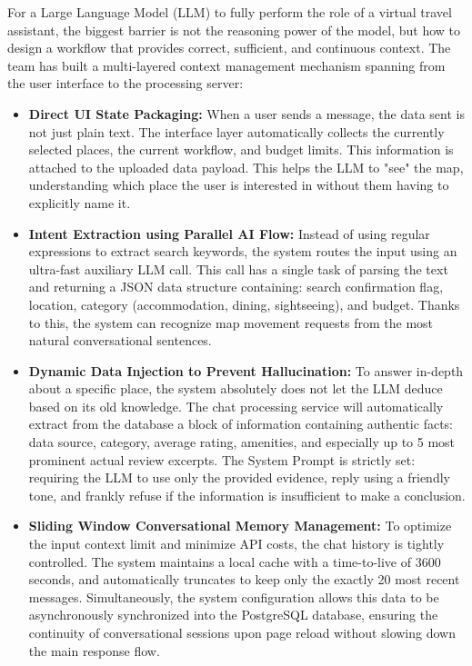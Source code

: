 \documentclass[12pt, a4paper]{article}
\begin{document}
\label{sec:llm_context}
For a Large Language Model (LLM) to fully perform the role of a virtual travel assistant, the biggest barrier is not the reasoning power of the model, but how to design a workflow that provides correct, sufficient, and continuous context. The team has built a multi-layered context management mechanism spanning from the user interface to the processing server:

\begin{itemize}
    \item \textbf{Direct UI State Packaging:} When a user sends a message, the data sent is not just plain text. The interface layer automatically collects the currently selected places, the current workflow, and budget limits. This information is attached to the uploaded data payload. This helps the LLM to "see" the map, understanding which place the user is interested in without them having to explicitly name it.
    \item \textbf{Intent Extraction using Parallel AI Flow:} Instead of using regular expressions to extract search keywords, the system routes the input using an ultra-fast auxiliary LLM call. This call has a single task of parsing the text and returning a JSON data structure containing: search confirmation flag, location, category (accommodation, dining, sightseeing), and budget. Thanks to this, the system can recognize map movement requests from the most natural conversational sentences.
    \item \textbf{Dynamic Data Injection to Prevent Hallucination:} To answer in-depth about a specific place, the system absolutely does not let the LLM deduce based on its old knowledge. The chat processing service will automatically extract from the database a block of information containing authentic facts: data source, category, average rating, amenities, and especially up to 5 most prominent actual review excerpts. The System Prompt is strictly set: requiring the LLM to use only the provided evidence, reply using a friendly tone, and frankly refuse if the information is insufficient to make a conclusion.
    \item \textbf{Sliding Window Conversational Memory Management:} To optimize the input context limit and minimize API costs, the chat history is tightly controlled. The system maintains a local cache with a time-to-live of 3600 seconds, and automatically truncates to keep only the exactly 20 most recent messages. Simultaneously, the system configuration allows this data to be asynchronously synchronized into the PostgreSQL database, ensuring the continuity of conversational sessions upon page reload without slowing down the main response flow.
\end{itemize}
\end{document}
